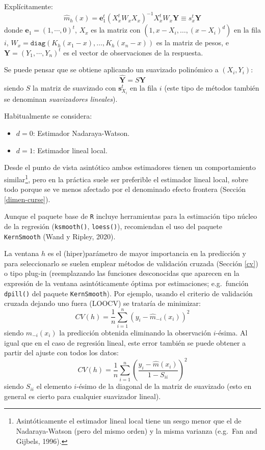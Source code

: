\documentclass[
]{book}
\theoremstyle{break}
\theoremstyle{definition}
\theoremstyle{definition}
\theoremstyle{definition}
\theoremstyle{definition}
\theoremstyle{remark}
\begin{document}
Explícitamente:
\[\hat{m}_{h}(x) = \mathbf{e}_{1}^{t} \left(
X_{x}^{t} {W}_{x} 
X_{x} \right)^{-1} X_{x}^{t} 
{W}_{x}\mathbf{Y} \equiv {s}_{x}^{t}\mathbf{Y}\]
donde \(\mathbf{e}_{1} = \left( 1, \cdots, 0\right)^{t}\), \(X_{x}\)
es la matriz con \((1,x - X_i, \ldots, (x - X_i)^d)\) en la fila \(i\),
\(W_{x} = \mathtt{diag} \left( K_{h}(x_{1} - x), \ldots, K_{h}(x_{n} - x) \right)\)
es la matriz de pesos, e \(\mathbf{Y} = \left( Y_1, \cdots, Y_n\right)^{t}\) es el vector de observaciones de la respuesta.

Se puede pensar que se obtiene aplicando un suavizado polinómico a
\((X_i, Y_i)\):
\[\hat{\mathbf{Y}} = S\mathbf{Y}\]
siendo \(S\) la matriz de suavizado con \(\mathbf{s}_{X_{i}}^{t}\) en la fila \(i\) (este tipo de métodos también se denominan \emph{suavizadores lineales}).

Habitualmente se considera:

\begin{itemize}
\item
  \(d=0\): Estimador Nadaraya-Watson.
\item
  \(d=1\): Estimador lineal local.
\end{itemize}

Desde el punto de vista asintótico ambos estimadores tienen un comportamiento similar\footnote{Asintóticamente el estimador lineal local tiene un sesgo menor que el de Nadaraya-Watson (pero del mismo orden) y la misma varianza (e.g.~Fan and Gijbels, 1996).}, pero en la práctica suele ser preferible el estimador lineal local, sobre todo porque se ve menos afectado por el denominado efecto frontera (Sección \ref{dimen-curse}).

Aunque el paquete base de \texttt{R} incluye herramientas para la estimación tipo núcleo de la regresión (\texttt{ksmooth()}, \texttt{loess()}), recomiendan el uso del paquete \texttt{KernSmooth} (Wand y Ripley, 2020).

La ventana \(h\) es el (hiper)parámetro de mayor importancia en la predicción y para seleccionarlo se suelen emplear métodos de validación cruzada (Sección \ref{cv}) o tipo plug-in (reemplazando las funciones desconocidas que aparecen en la expresión de la ventana asintóticamente óptima por estimaciones; e.g.~función \texttt{dpill()} del paquete \texttt{KernSmooth}).
Por ejemplo, usando el criterio de validación cruzada dejando uno fuera (LOOCV) se trataría de minimizar:
\[CV(h)=\frac{1}{n}\sum_{i=1}^n(y_i-\hat{m}_{-i}(x_i))^2\]
siendo \(\hat{m}_{-i}(x_i)\) la predicción obtenida eliminando la observación \(i\)-ésima.
Al igual que en el caso de regresión lineal, este error también se puede obtener a partir del ajuste con todos los datos:
\[CV(h)=\frac{1}{n}\sum_{i=1}^n\left(\frac{y_i-\hat{m}(x_i)}{1 - S_{ii}}\right)^2\]
siendo \(S_{ii}\) el elemento \(i\)-ésimo de la diagonal de la matriz de suavizado (esto en general es cierto para cualquier suavizador lineal).
\end{document}
